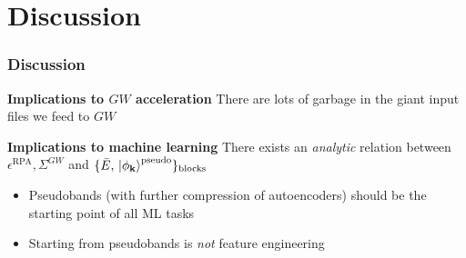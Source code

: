 \documentclass[t,aspectratio=169]{beamer}
\begin{document}
\section{Discussion}

\begin{frame}
\frametitle{Discussion}
    
\textbf{Implications to $GW$ acceleration} There are lots of garbage in the giant input files we feed to $GW$

\textbf{Implications to machine learning} There exists an \emph{analytic} relation between $\epsilon^{\text{RPA}}, \Sigma^{GW}$ and $\{\bar{E}, \ket*{\phi_{\vb{k}}}^{\text{pseudo}} \}_{\text{blocks}}$

\begin{itemize}
    \item Pseudobands (with further compression of autoencoders) should be the starting point of all ML tasks
    \item Starting from pseudobands is \emph{not} feature engineering
\end{itemize}

\end{frame}
\end{document}
